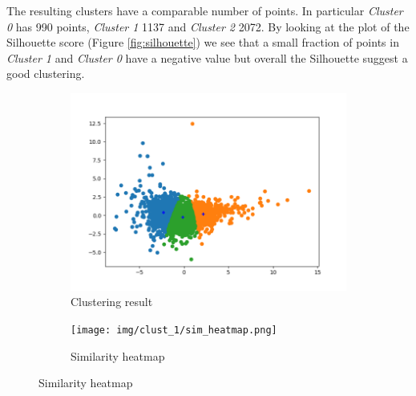 The resulting clusters have a comparable number of points. In particular \emph{Cluster 0} has 990 points, \emph{Cluster 1} 1137 and \emph{Cluster 2} 2072. By looking at the plot of the Silhouette score (Figure \ref{fig:silhouette}) we see that a small fraction of points in \emph{Cluster 1} and \emph{Cluster 0} have a negative value but overall the Silhouette suggest a good clustering.

\begin{figure}[h!]
    \centering
    \begin{subfigure}{0.49\textwidth}
        \includegraphics[width=\linewidth]{img/clust_1/km_clusters.png}
        \caption{Clustering result}
        \label{fig:skmclust}
    \end{subfigure}
    \begin{subfigure}{0.49\textwidth}
        \texttt{[image: img/clust\_1/sim\_heatmap.png]}
        \caption{Similarity heatmap}
        \label{fig:sim_heatmap}
    \end{subfigure}
    

\end{figure}
